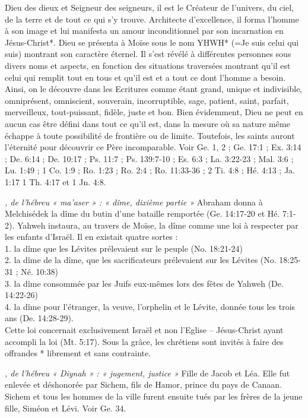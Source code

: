 \begin{multicols}{2}
{\textit{}\newline
Dieu des dieux et Seigneur des seigneurs, il est le Créateur de l'univers, du ciel, de la terre et de tout ce qui s'y trouve. Architecte d'excellence, il forma l'homme à son image et lui manifesta un amour inconditionnel par son incarnation en Jésus-Christ*. Dieu se présenta à Moïse sous le nom YHWH* (=Je suis celui qui suis) montrant son caractère éternel. Il s'est révélé à différentes personnes sous divers noms et aspects, en fonction des situations traversées montrant qu'il est celui qui remplit tout en tous et qu'il est et a tout ce dont l'homme a besoin. Ainsi, on le découvre dans les Ecritures comme étant grand, unique et indivisible, omniprésent, omniscient, souverain, incorruptible, sage, patient, saint, parfait, merveilleux, tout-puissant, fidèle, juste et bon. Bien évidemment, Dieu ne peut en aucun cas être défini dans tout ce qu'il est, dans la mesure où sa nature même échappe à toute possibilité de frontière ou de limite. Toutefois, les saints auront l'éternité pour découvrir ce Père incomparable. Voir Ge. 1, 2 ; Ge. 17:1 ; Ex. 3:14 ; De. 6:14 ; De. 10:17 ; Ps. 11:7 ; Ps. 139:7-10 ; Es. 6:3 ; La. 3:22-23 ; Mal. 3:6 ; Lu. 1:49 ; 1 Co. 1:9 ; Ro. 1:23 ; Ro. 2:4 ; Ro. 11:33-36 ; 2 Ti. 4:8 ; Hé. 4:13 ; Ja. 1:17 1 Th. 4:17 et 1 Jn. 4:8.

\textit{, de l'hébreu « ma'aser » : « dîme, dixième partie »}\newline
Abraham donna à Melchisédek la dîme du butin d'une bataille remportée (Ge. 14:17-20 et Hé. 7:1-2). Yahweh instaura, au travers de Moïse, la dîme comme une loi à respecter par les enfants d'Israël. Il en existait quatre sortes :
\\1. la dîme que les Lévites prélevaient sur le peuple (No. 18:21-24)
\\2. la dîme de la dîme, que les sacrificateurs prélevaient sur les Lévites (No. 18:25-31 ; Né. 10:38)
\\3. la dîme consommée par les Juifs eux-mêmes lors des fêtes de Yahweh (De. 14:22-26)
\\4. la dîme pour l'étranger, la veuve, l'orphelin et le Lévite, donnée tous les trois ans (De. 14:28-29).
\\Cette loi concernait exclusivement Israël et non l'Eglise – Jésus-Christ ayant accompli la loi (Mt. 5:17). Sous la grâce, les chrétiens sont invités à faire des offrandes * librement et sans contrainte.

\textit{, de l'hébreu « Diynah » : « jugement, justice »}\newline
Fille de Jacob et Léa. Elle fut enlevée et déshonorée par Sichem, fils de Hamor, prince du pays de Canaan. Sichem et tous les hommes de la ville furent ensuite tués par les frères de la jeune fille, Siméon et Lévi. Voir Ge. 34.

}
\end{multicols}
